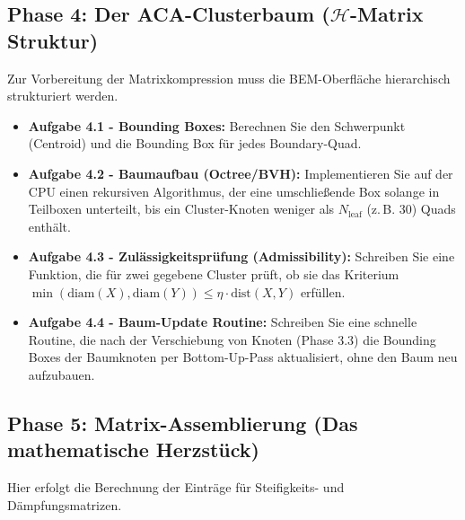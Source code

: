 \documentclass[11pt,a4paper]{article}
\begin{document}
\subsection{Phase 4: Der ACA-Clusterbaum ($\mathcal{H}$-Matrix Struktur)}
Zur Vorbereitung der Matrixkompression muss die BEM-Oberfläche hierarchisch strukturiert werden.

\begin{itemize}
    \item \textbf{Aufgabe 4.1 - Bounding Boxes:} Berechnen Sie den Schwerpunkt (Centroid) und die Bounding Box für jedes Boundary-Quad.
    \item \textbf{Aufgabe 4.2 - Baumaufbau (Octree/BVH):} Implementieren Sie auf der CPU einen rekursiven Algorithmus, der eine umschließende Box solange in Teilboxen unterteilt, bis ein Cluster-Knoten weniger als $N_{\text{leaf}}$ (z.\,B. 30) Quads enthält.
    \item \textbf{Aufgabe 4.3 - Zulässigkeitsprüfung (Admissibility):} Schreiben Sie eine Funktion, die für zwei gegebene Cluster prüft, ob sie das Kriterium $\min(\text{diam}(X), \text{diam}(Y)) \le \eta \cdot \text{dist}(X, Y)$ erfüllen.
    \item \textbf{Aufgabe 4.4 - Baum-Update Routine:} Schreiben Sie eine schnelle Routine, die nach der Verschiebung von Knoten (Phase 3.3) die Bounding Boxes der Baumknoten per Bottom-Up-Pass aktualisiert, ohne den Baum neu aufzubauen.
\end{itemize}

\subsection{Phase 5: Matrix-Assemblierung (Das mathematische Herzstück)}
Hier erfolgt die Berechnung der Einträge für Steifigkeits- und Dämpfungsmatrizen.
\end{document}
